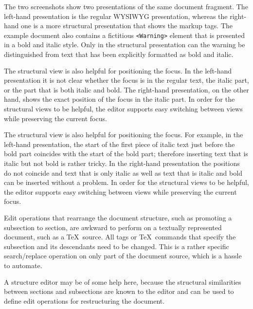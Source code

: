 \documentclass{speauth}
\begin{document}
The two screenshots show two presentations of the same document fragment. The left-hand presentation is the regular WYSIWYG presentation, whereas the right-hand one is a more structural presentation that shows the markup tags. The example document also contains a fictitious \verb|<Warning>| element that is presented in a bold and italic style. Only in the structural presentation can the warning be distinguished from text that has been explicitly formatted as bold and italic.

The structural view is also helpful for positioning the focus. In the left-hand presentation it is not clear whether the focus is in the regular text, the italic part, or the part that is both italic and bold. The right-hand presentation, on the other hand, shows the exact position of the focus in the italic part. In order for the structural views to be helpful, the editor supports easy switching between views while preserving the current focus.

\bc
The structural view is also helpful for positioning the focus. For example, in the left-hand presentation, the start of the first piece of italic text just before the bold part coincides with the start of the bold part; therefore inserting text that is italic but not bold is rather tricky. In the right-hand presentation the positions do not coincide and text that is only italic as well as text that is italic and bold can be inserted without a problem. In order for the structural views to be helpful, the editor supports easy switching between views while preserving the current focus.
\ec



Edit operations that rearrange the document structure, such as promoting a subsection to section, are awkward to perform on a textually represented document, such as a \TeX\ source. All tags or \TeX\ commands that specify the subsection and its descendants need to be changed. This is a rather specific search/replace operation on only part of the document source, which is a hassle to automate.

A structure editor may be of some help here, because the structural similarities between sections and subsections are known to the editor and can be used to define edit operations for restructuring the document.
\end{document}

